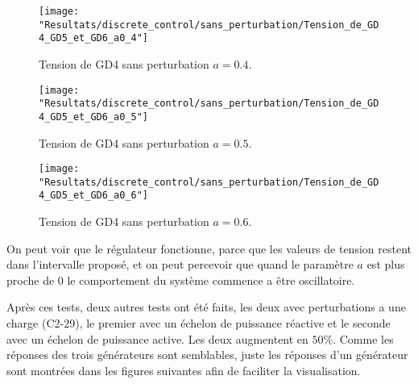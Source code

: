 \vspace{2em}
 \begin{minipage}{.475\textwidth}
 \begin{figure}[H]
 	\begin{center}
 		\captionsetup{justification=centering,margin=.5cm}	
 		\texttt{[image: "Resultats/discrete\_control/sans\_perturbation/Tension\_de\_GD4\_GD5\_et\_GD6\_a0\_4"]}
 		\caption{Tension de GD4 sans perturbation $ a =0.4$.}
 		\label{fig:Tension_de_GD4_GD5_et_GD6_a0_4}
 	\end{center}
 \end{figure}
\end{minipage}
 \begin{minipage}{.475\textwidth}
 \begin{figure}[H]
 	\begin{center}
 		\captionsetup{justification=centering,margin=.5cm}	
 		\texttt{[image: "Resultats/discrete\_control/sans\_perturbation/Tension\_de\_GD4\_GD5\_et\_GD6\_a0\_5"]}
 		\caption{Tension de GD4 sans perturbation $ a =0.5$.}
 		\label{fig:Tension_de_GD4_GD5_et_GD6_a0_5}
 	\end{center}
 \end{figure}
 \end{minipage}

 \begin{figure}[H]
 	\begin{center}	
 		\texttt{[image: "Resultats/discrete\_control/sans\_perturbation/Tension\_de\_GD4\_GD5\_et\_GD6\_a0\_6"]}
 		\caption{Tension de GD4 sans perturbation $ a =0.6$.}
 		\label{fig:Tension_de_GD4_GD5_et_GD6_a0_6}
 	\end{center}
 \end{figure}
\newpage
On peut voir que le régulateur fonctionne, parce que les valeurs de tension restent dans l'intervalle proposé, et on peut percevoir que quand le paramètre $ a $ est plus proche de $ 0 $ le comportement du système commence a être oscillatoire.

Après ces tests, deux autres tests ont été faits, les deux avec perturbations a une charge (C2-29), le premier avec un échelon de puissance réactive et le seconde avec un échelon de puissance active. Les deux augmentent en $ 50\% $. Comme les réponses des trois générateurs sont semblables, juste les réponses d'un générateur sont montrées dans les figures suivantes afin de faciliter la visualisation.

